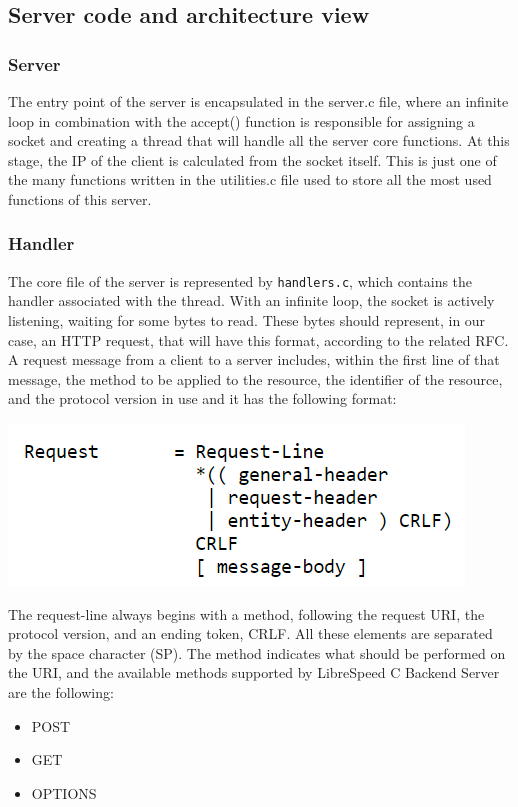 \documentclass{article}
\begin{document}
\subsection{Server code and architecture view}
\subsubsection{Server}
The entry point of the server is encapsulated in the server.c file, where an infinite loop in combination with the accept() function is responsible for assigning a socket and creating a thread that will handle all the server core functions. At this stage, the IP of the client is calculated from the socket itself. This is just one of the many functions written in the utilities.c file used to store all the most used functions of this server.

\subsubsection{Handler}
The core file of the server is represented by \texttt{handlers.c}, which contains the handler associated with the thread. With an infinite loop, the socket is actively listening, waiting for some bytes to read. These bytes should represent, in our case, an HTTP request, that will have this format, according to the related RFC.
A request message from a client to a server includes, within the first line of that message, the method to be applied to the resource, the identifier of the resource, and the protocol version in use and it has the following format:

\begin{center}
\begin{minipage}{8cm}
\includegraphics[width=\textwidth]{7-format}
\end{minipage}
\end{center}

The request-line always begins with a method, following the request URI, the protocol version, and an ending token, CRLF. All these elements are separated by the space character (SP).
The method indicates what should be performed on the URI, and the available methods supported by LibreSpeed C Backend Server are the following:
\begin{itemize}
\item POST
\item GET
\item OPTIONS
\end{itemize}
\end{document}
